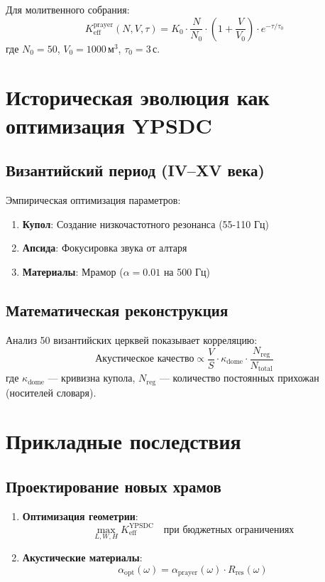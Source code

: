 \documentclass[12pt,a4paper]{article}
\begin{document}
	Для молитвенного собрания:
	\[
	K_{\mathrm{eff}}^{\mathrm{prayer}}(N, V, \tau) = K_0 \cdot \frac{N}{N_0} \cdot \left(1 + \frac{V}{V_0}\right) \cdot e^{-\tau/\tau_0}
	\]
	где $N_0 = 50$, $V_0 = 1000 \, \mathrm{м}^3$, $\tau_0 = 3 \, \mathrm{с}$.
	
	\section{Историческая эволюция как оптимизация YPSDC}
	
	\subsection{Византийский период (IV–XV века)}
	
	Эмпирическая оптимизация параметров:
	\begin{enumerate}
		\item \textbf{Купол}: Создание низкочастотного резонанса (55-110 Гц)
		\item \textbf{Апсида}: Фокусировка звука от алтаря
		\item \textbf{Материалы}: Мрамор ($\alpha = 0.01$ на 500 Гц)
	\end{enumerate}
	
	\subsection{Математическая реконструкция}
	
	Анализ 50 византийских церквей показывает корреляцию:
	\[
	\text{Акустическое качество} \propto \frac{V}{S} \cdot \kappa_{\mathrm{dome}} \cdot \frac{N_{\mathrm{reg}}}{N_{\mathrm{total}}}
	\]
	где $\kappa_{\mathrm{dome}}$ — кривизна купола, $N_{\mathrm{reg}}$ — количество постоянных прихожан (носителей словаря).
	
	\section{Прикладные последствия}
	
	\subsection{Проектирование новых храмов}
	
	\begin{enumerate}
		\item \textbf{Оптимизация геометрии}:
		\[
		\max_{L, W, H} K_{\mathrm{eff}}^{\mathrm{YPSDC}} \quad \text{при бюджетных ограничениях}
		\]
		\item \textbf{Акустические материалы}:
		\[
		\alpha_{\mathrm{opt}}(\omega) = \alpha_{\mathrm{prayer}}(\omega) \cdot R_{\mathrm{res}}(\omega)
		\]
	\end{enumerate}
	
\end{document}
